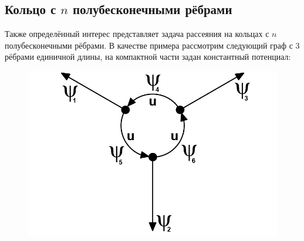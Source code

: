 \documentclass[a4 paper, 12 pt]{extarticle}
\begin{document}
   \subsection{Кольцо с $n$ полубесконечными рёбрами}
   Также определённый интерес представляет задача рассеяния на кольцах с $n$ полубесконечными рёбрами. В качестве примера рассмотрим следующий граф с 3 рёбрами единичной длины, на компактной части задан константный потенциал:
   \begin{figure}[h]
   	\centering
   	\includegraphics[scale=0.5]{arrow_graph.jpg}
   \end{figure}
   
\end{document}
